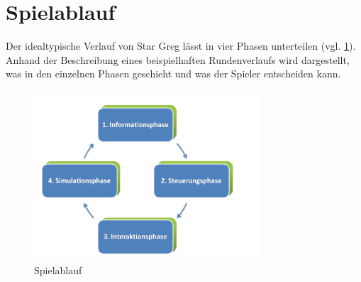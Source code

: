 \section{Spielablauf}
\label{sec:spielwelt-regeln}


Der idealtypische Verlauf von Star Greg lässt in vier Phasen unterteilen (vgl. \ref{fig:ablaufbild}). Anhand der Beschreibung eines beispielhaften Rundenverlaufs wird dargestellt, was in den einzelnen Phasen geschieht und was der Spieler entscheiden kann.

\begin{figure}[htb]
\centering
\includegraphics[width=0.75\textwidth]{20_Spielwelt/40_Regeln_Ablauf/Spielablauf.png}
\caption{Spielablauf}\label{fig:ablaufbild}
\end{figure}









\autorende{}